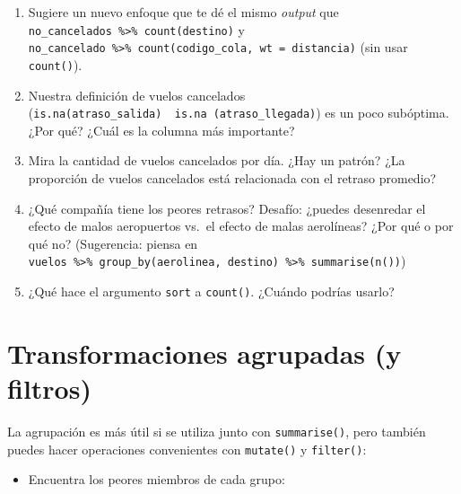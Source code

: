 \documentclass[11pt,oneside]{report}
\providecommand{\tightlist}{%
  \setlength{\itemsep}{0pt}\setlength{\parskip}{0pt}}
\begin{document}
\begin{enumerate}
\def\labelenumi{\arabic{enumi}.}
\setcounter{enumi}{1}
\item
  Sugiere un nuevo enfoque que te dé el mismo \emph{output} que
  \texttt{no\_cancelados\ \%\textgreater{}\%\ count(destino)} y
  \texttt{no\_cancelado\ \%\textgreater{}\%\ count(codigo\_cola,\ wt\ =\ distancia)}
  (sin usar \texttt{count()}).
\item
  Nuestra definición de vuelos cancelados
  (\texttt{is.na(atraso\_salida)\ \textbar{}\ is.na\ (atraso\_llegada)})
  es un poco subóptima. ¿Por qué? ¿Cuál es la columna más importante?
\item
  Mira la cantidad de vuelos cancelados por día. ¿Hay un patrón? ¿La
  proporción de vuelos cancelados está relacionada con el retraso
  promedio?
\item
  ¿Qué compañía tiene los peores retrasos? Desafío: ¿puedes desenredar
  el efecto de malos aeropuertos vs.~el efecto de malas aerolíneas? ¿Por
  qué o por qué no? (Sugerencia: piensa en
  \texttt{vuelos\ \%\textgreater{}\%\ group\_by(aerolinea,\ destino)\ \%\textgreater{}\%\ summarise(n())})
\item
  ¿Qué hace el argumento \texttt{sort} a \texttt{count()}. ¿Cuándo
  podrías usarlo?
\end{enumerate}

\hypertarget{transformaciones-agrupadas-y-filtros}{%
\section{Transformaciones agrupadas (y
filtros)}\label{transformaciones-agrupadas-y-filtros}}

La agrupación es más útil si se utiliza junto con \texttt{summarise()},
pero también puedes hacer operaciones convenientes con \texttt{mutate()}
y \texttt{filter()}:

\begin{itemize}
\tightlist
\item
  Encuentra los peores miembros de cada grupo:
\end{itemize}
\end{document}
